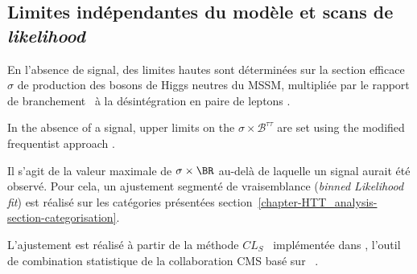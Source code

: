 \subsection{Limites indépendantes du modèle et scans de \emph{likelihood}}\label{chapter-HTT_analysis-section-signal_extraction-model_indep_and_likelihood}


En l'absence de signal, des limites hautes sont déterminées sur la section efficace $\sigma$ de production des bosons de Higgs neutres du MSSM, multipliée par le rapport de branchement \BR\ à la désintégration en paire de leptons \tau.

In the absence of a signal, upper limits on the $\sigma\times\mathcal{B}^{\tau\tau}$ are set using the modified frequentist approach \citep{Junk:1999kv,Read_2002}.

Il s'agit de la valeur maximale de $\sigma\times\BR$ au-delà de laquelle un signal aurait été observé.
Pour cela, un ajustement segmenté de vraisemblance (\emph{binned Likelihood fit}) est réalisé sur les catégories présentées section~\ref{chapter-HTT_analysis-section-categorisation}.
\par
L'ajustement est réalisé à partir de la méthode $CL_S$~\cite{CLs_method} implémentée dans \COMBINE, l'outil de combination statistique de la collaboration CMS basé sur \ROOSTATS~\cite{RooStats}.

